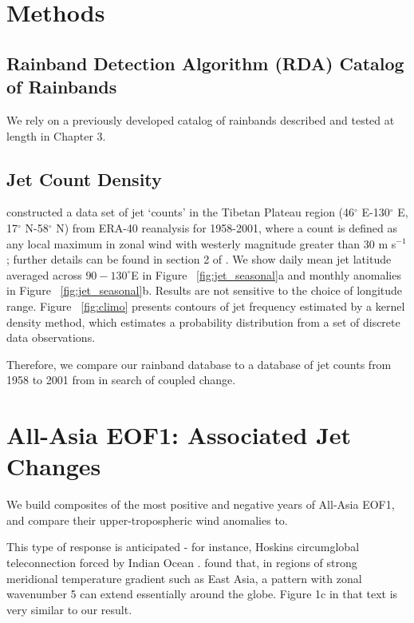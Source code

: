 	
\section{Methods}

\subsection{Rainband Detection Algorithm (RDA) Catalog of Rainbands}

	We rely on a previously developed catalog of rainbands described and tested at length in Chapter 3.

\subsection{Jet Count Density} 

	\citet{Schiemann2009} constructed a data set of jet `counts' in the Tibetan Plateau region (46$^{\circ}$ E-130$^{\circ}$ E, 17$^{\circ}$ N-58$^{\circ}$ N) from ERA-40 reanalysis for 1958-2001, where a count is defined as any local maximum in zonal wind with westerly magnitude greater than $30$ m s$^{-1}$; further details can be found in section 2 of \citet{Schiemann2009}. We show daily mean jet latitude averaged across $90-130^\circ$E in Figure ~\ref{fig:jet_seasonal}a and monthly anomalies in Figure ~\ref{fig:jet_seasonal}b. Results are not sensitive to the choice of longitude range. Figure ~\ref{fig:climo} presents contours of jet frequency estimated by a kernel density method, which estimates a probability distribution from a set of discrete data observations.
	
	Therefore, we compare our rainband database to a database of jet counts from 1958 to 2001 from \citet{Schiemann2009} in search of coupled change. 
	
\section{All-Asia EOF1: Associated Jet Changes}

	We build composites of the most positive and negative years of All-Asia EOF1, and compare their upper-tropospheric wind anomalies to. 
	
	This type of response is anticipated - for instance, Hoskins circumglobal teleconnection forced by Indian Ocean \citep{Ding2005a,Ding2007}. \citet{Branstator2002} found that, in regions of strong meridional temperature gradient such as East Asia, a pattern with zonal wavenumber 5 can extend essentially around the globe. Figure 1c in that text is very similar to our result.

